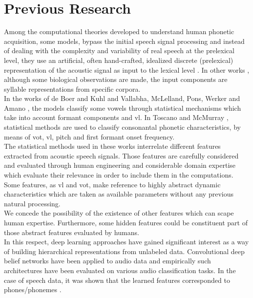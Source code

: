 \documentclass[11pt,a4paper]{article}
\begin{document}
\section{Previous Research}

Among the computational theories developed to understand
human phonetic acquisition, some models, bypass the initial
speech signal processing and
instead of dealing with the complexity and variability of real speech
at the prelexical  level, they use an artificial, often hand-crafted, 
idealized discrete (prelexical) representation of the acoustic
signal as input to the lexical level \cite{scharenborg_2010}.
In other works \cite{dominey_2000}, although some biological observations are made,
the input components are syllable representations from specific corpora.\\

In the works of de Boer and Kuhl \cite{boer_2003} and Vallabha, McLelland, Pons,
Werker and Amano \cite{vallabha_2007}, the models classify some vowels
through statistical mechanisms which take into account formant components
and \gls{vl}.
In Toscano and McMurray \cite{toscano_2010},
statistical methods are used to classify consonantal phonetic
characteristics, by means of \gls{vot},
\gls{vl}, pitch and first formant onset frequency. \\

The statistical methods used in these works interrelate
different features extracted from acoustic speech signals.
Those features are carefully considered and evaluated
through human engineering and considerable domain expertise
which evaluate their relevance in order to include them
in the computations.
Some features, as \gls{vl} and \gls{vot},
make reference to highly abstract dynamic characteristics
which are taken
as available parameters without any previous natural
processing.\\

We concede the possibility of the existence of other
features which can scape human expertise.
Furthermore, some hidden features could be constituent
part of those abstract features evaluated by humans. \\

In this respect, deep learning approaches have gained significant interest as a
way of building hierarchical representations from unlabeled data.
Convolutional deep belief networks have been applied to audio data and empirically
such architectures have been evaluated on various audio classification
tasks. In the case of speech data, it was shown that the learned features corresponded
to phones/phonemes \cite{Lee:2009:UFL:2984093.2984217}. \\
\end{document}
